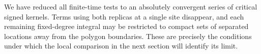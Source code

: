 We have reduced all finite-time tests to an absolutely convergent
series of critical signed kernels.  Terms using both replicas at a
single site disappear, and each remaining fixed-degree integral may
be restricted to compact sets of separated locations away from the
polygon boundaries.  These are precisely the conditions under which
the local comparison in the next section will identify its limit.
